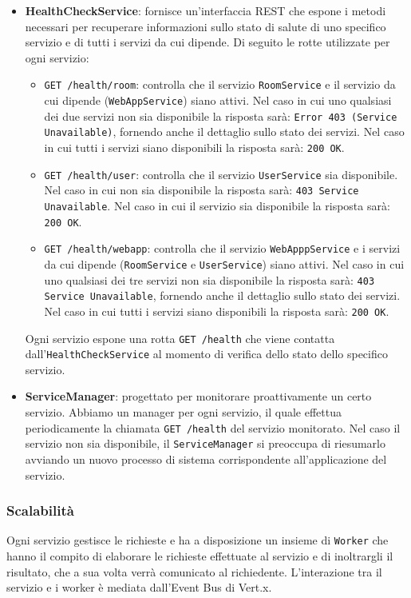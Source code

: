 \documentclass[a4paper]{article}
\begin{document}
\begin{itemize}
    \item \textbf{HealthCheckService}: fornisce un'interfaccia REST che espone i metodi necessari per recuperare informazioni sullo stato di salute di uno specifico servizio e di tutti i servizi da cui dipende.
    Di seguito le rotte utilizzate per ogni servizio:
    \begin{itemize}
        \item \texttt{GET /health/room}: controlla che il servizio \texttt{RoomService} e il servizio da cui dipende (\texttt{WebAppService}) siano attivi. Nel caso in cui uno qualsiasi dei due servizi non sia disponibile la risposta sarà: \texttt{Error 403 (Service Unavailable)}, fornendo anche il dettaglio sullo stato dei servizi. Nel caso in cui tutti i servizi siano disponibili la risposta sarà: \texttt{200 OK}.
        \item \texttt{GET /health/user}: controlla che il servizio \texttt{UserService} sia disponibile. Nel caso in cui non sia disponibile la risposta sarà: \texttt{403 Service Unavailable}. Nel caso in cui il servizio sia disponibile la risposta sarà: \texttt{200 OK}.
        \item \texttt{GET /health/webapp}: controlla che il servizio \texttt{WebApppService} e i servizi da cui dipende (\texttt{RoomService} e \texttt{UserService}) siano attivi. Nel caso in cui uno qualsiasi dei tre servizi non sia disponibile la risposta sarà: \texttt{403 Service Unavailable}, fornendo anche il dettaglio sullo stato dei servizi. Nel caso in cui tutti i servizi siano disponibili la risposta sarà: \texttt{200 OK}.
    \end{itemize}
    Ogni servizio espone una rotta \texttt{GET /health} che viene contatta dall'\texttt{HealthCheckService} al momento di verifica dello stato dello specifico servizio.
        
    \item \textbf{ServiceManager}: progettato per monitorare proattivamente un certo servizio.
    Abbiamo un manager per ogni servizio, il quale effettua periodicamente la chiamata \texttt{GET /health} del servizio monitorato. Nel caso il servizio non sia disponibile, il \texttt{ServiceManager} si preoccupa di riesumarlo avviando un nuovo processo di sistema corrispondente all'applicazione del servizio.

\end{itemize}

\subsubsection{Scalabilità}
Ogni servizio gestisce le richieste e ha a disposizione un insieme di \texttt{Worker} che hanno il compito di elaborare le richieste effettuate al servizio e di inoltrargli il risultato, che a sua volta verrà comunicato al richiedente. L'interazione tra il servizio e i worker è mediata dall'Event Bus di Vert.x.
\end{document}
